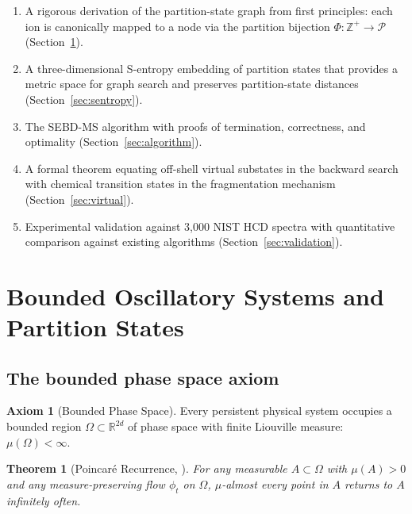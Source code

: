 \documentclass[twocolumn,10pt,a4paper]{article}
\theoremstyle{thmstyle}
\newtheorem{theorem}{Theorem}[section]
\theoremstyle{definition}
\newtheorem{axiom}{Axiom}
\theoremstyle{remark}
\newcommand{\R}{\mathbb{R}}
\newcommand{\Zp}{\mathbb{Z}^{+}}
\newcommand{\Parts}{\mathcal{P}}
\newcommand{\PhiMap}{\varPhi}
\begin{document}
\begin{enumerate}[nosep,label=(\roman*)]
\item A rigorous derivation of the partition-state graph from
  first principles: each ion is canonically mapped to a node via
  the partition bijection $\PhiMap: \Zp \to \Parts$
  (Section~\ref{sec:partition}).

\item A three-dimensional S-entropy embedding of partition states that
  provides a metric space for graph search and preserves partition-state
  distances (Section~\ref{sec:sentropy}).

\item The SEBD-MS algorithm with proofs of termination, correctness,
  and optimality (Section~\ref{sec:algorithm}).

\item A formal theorem equating off-shell virtual substates in the
  backward search with chemical transition states in the fragmentation
  mechanism (Section~\ref{sec:virtual}).

\item Experimental validation against 3{,}000 NIST HCD spectra with
  quantitative comparison against existing algorithms
  (Section~\ref{sec:validation}).
\end{enumerate}

\section{Bounded Oscillatory Systems and Partition States}
\label{sec:partition}

\subsection{The bounded phase space axiom}

\begin{axiom}[Bounded Phase Space]
\label{ax:bps}
Every persistent physical system occupies a bounded region
$\Omega \subset \R^{2d}$ of phase space with finite Liouville measure:
$\mu(\Omega) < \infty$.
\end{axiom}

\begin{theorem}[Poincar{\'e} Recurrence, \citealp{poincare1890}]
For any measurable $A \subset \Omega$ with $\mu(A) > 0$ and any
measure-preserving flow $\phi_t$ on $\Omega$, $\mu$-almost every point
in $A$ returns to $A$ infinitely often.
\end{theorem}
\end{document}
